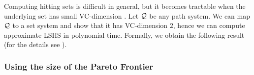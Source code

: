 
Computing hitting sets is difficult in general, but it becomes tractable when the underlying set has small VC-dimension \cite{vc_dim_hitting}.
Let $\mathcal{Q}$ be any path system.
We can map $\mathcal{Q}$ to a set system and show that it has VC-dimension $2$, hence we can compute approximate LSHS in polynomial time.
Formally, we obtain the following result (for the details see \cite{TechReport}).


\subsubsection{Using the size of the Pareto Frontier}
\label{sec:frontier}

